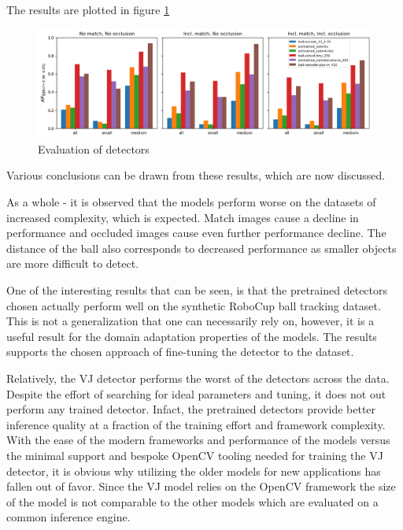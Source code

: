 \documentclass[a4paper,twoside,12pt]{report}
\begin{document}
The results are plotted in figure \ref{fig:evaldetect}

\begin{figure}[h!]
\begin{center}
\includegraphics[width=15.5cm]{images/eval_detect.png}
\caption{Evaluation of detectors}
\label{fig:evaldetect}
\end{center}
\end{figure}

Various conclusions can be drawn from these results, which are now discussed.

As a whole - it is observed that the models perform worse on the datasets of increased complexity, which is expected. Match images cause a decline in performance and occluded images cause even further performance decline. The distance of the ball also corresponds to decreased performance as smaller objects are more difficult to detect. 

One of the interesting results that can be seen, is that the pretrained detectors chosen actually perform well on the synthetic RoboCup ball tracking dataset. This is not a generalization that one can necessarily rely on, however, it is a useful result for the domain adaptation properties of the models. The results supports the chosen approach of fine-tuning the detector to the dataset.

Relatively, the VJ detector performs the worst of the detectors across the data. Despite the effort of searching for ideal parameters and tuning, it does not out perform any trained detector. Infact, the pretrained detectors provide better inference quality at a fraction of the training effort and framework complexity. With the ease of the modern  frameworks and performance of the models versus the minimal support and bespoke OpenCV tooling needed for training the VJ detector, it is obvious why utilizing the older models for new applications has fallen out of favor. Since the VJ model relies on the OpenCV framework the size of the model is not comparable to the other models which are evaluated on a common inference engine.
\end{document}
